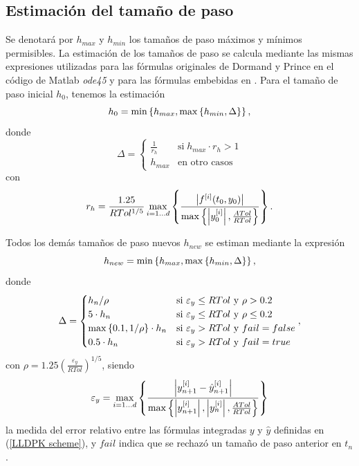\subsection{Estimación del tamaño de paso}\label{secc:stepsizes}
Se denotará por $h_{max}$ y $h_{min}$ los tamaños de paso máximos y mínimos permisibles. La estimación de los tamaños de paso se calcula mediante las mismas expresiones utilizadas para las fórmulas originales de Dormand y Prince en el código de Matlab \textit{ode45} \cite{shampine1997matlab} y para las fórmulas embebidas en \cite{Jimenez14AMC}. Para el tamaño de paso inicial $h_0$, tenemos la estimación
\begin{equation}
    h_0 = \min\left\{  h_{max}, \max\left\{  h_{min} ,\Delta \right\}  \right\}, \label{hcero}
\end{equation}
donde
\begin{equation*}
    \Delta = \begin{cases}
        \frac{1}{r_h} & \text{si} \; h_{max}\cdot r_h>1\\
        h_{max} & \text{en otro casos}
        \end{cases}
\end{equation*}
con
\begin{equation*}
     r_h = \frac{1\mathord{.}25}{RTol^{1/5}}\max_{i=1\ldots d}\left\{\frac{ \left\lvert f^{[i]}(t_0,y_0) \right\rvert }
    {\max\left\{ \left\lvert y^{[i]}_0 \right\rvert ,\frac{ATol}{RTol} \right\}}\right\}.
\end{equation*}

Todos los demás tamaños de paso nuevos $h_{new}$ se estiman mediante la expresión
\begin{equation}
    h_{new} = \min\left\{ h_{max},\max\left\{ h_{min},\Delta \right\} \right\}, \label{hnewcalc}
\end{equation}
donde
\begin{equation*}
    \Delta = \begin{cases}
        h_n/\rho & \text{si } \varepsilon_y\leq RTol \text{ y } \rho>0\mathord{.}2\\
        5\cdot h_n & \text{si } \varepsilon_y\leq RTol \text{ y } \rho\leq 0\mathord{.}2\\
        \max\left\{ 0\mathord{.}1,1/\rho \right\}\cdot h_n & \text{si } \varepsilon_y > RTol \text{ y } fail=false\\
        0\mathord{.}5\cdot h_n & \text{si } \varepsilon_y > RTol \text{ y } fail=true
        \end{cases},
\end{equation*}
con $\rho = 1\mathord{.}25 \left( \frac{\varepsilon_y}{RTol} \right)^{1/5}$, siendo
\begin{equation}\label{epsilon_y}
	\varepsilon_y =  \max_{i=1\ldots d}\left\{ \frac{\left\lvert y^{[i]}_{n+1}-\hat{y}^{[i]}_{n+1} \right\rvert}
	{\max\left\{ \left\lvert y^{[i]}_{n+1}  \right\rvert,\left\lvert y^{[i]}_{n}\right\rvert,\frac{ATol}{RTol} \right\}} \right\}
\end{equation}
la medida del error relativo entre las fórmulas integradas $y$ y $\hat{y}$ definidas en (\ref{LLDPK scheme}), y $fail$ indica que se rechazó un tamaño de paso anterior en $t_n$.

